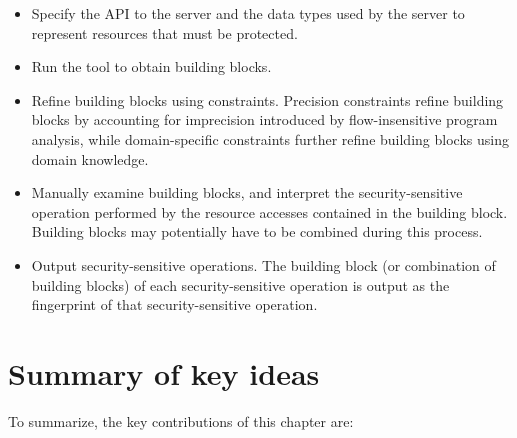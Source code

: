 \begin{itemize}

\item Specify the API to the server and the data types used by the server to
represent resources that must be protected.

\item Run the tool to obtain building blocks.

\item Refine building blocks using constraints. Precision constraints refine
building blocks by accounting for imprecision introduced by flow-insensitive
program analysis, while domain-specific constraints further refine building
blocks using domain knowledge.

\item Manually examine building blocks, and interpret the security-sensitive
operation performed by the resource accesses contained in the building block.
Building blocks may potentially have to be combined during this process. 

\item Output security-sensitive operations. The building block (or combination
of building blocks) of each security-sensitive operation is output as the
fingerprint of that security-sensitive operation.

\end{itemize}


\section{Summary of key ideas}
\label{chapter:static:keyideas}

To summarize, the key contributions of this chapter are:

